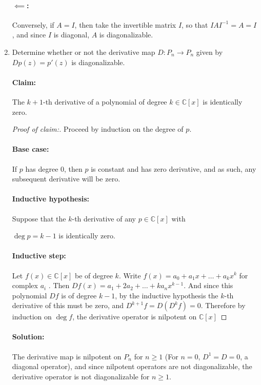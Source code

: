 \documentclass{article}
\begin{document}
\begin{enumerate}
    \paragraph{$\impliedby$:} Conversely, if $A=I$, then take the invertible matrix $I$, so that $IAI^{-1}=A=I$, and since $I$ is diagonal, $A$ is diagonalizable. 

\item Determine whether or not the derivative map $D : P_n \rightarrow P_n$ given by $Dp(z) = p'(z)$ is diagonalizable.
    \paragraph{Claim: }The $k+1$-th derivative of a polynomial of degree $k\in \mathbb{C}[x]$ is identically zero. 
    \begin{proof} [Proof of claim:]
        
  Proceed by induction on the degree of $p$. 
  \paragraph{Base case:} If $p$ has degree $0$, then $p$ is constant and has zero derivative, and as such, any subsequent derivative will be zero.
  \paragraph{Inductive hypothesis:} Suppose that the $k$-th derivative of any  $p \in \mathbb{C}[x]$ with 

  $\deg p=k-1$ is identically zero.
  \paragraph{Inductive step:} Let $f(x)\in \mathbb{C}[x]$ be of degree $k$. Write $f(x)=a_0+a_1x+\ldots+a_kx^{k}$ for complex $a_i$ . Then $Df(x)=a_1+2a_2+\ldots+ka_nx^{k-1}$. And since this polynomial $Df$ is of degree $k-1$, by the inductive hypothesis the $k$-th derivative of this must be zero, and \newline $D^{k+1}f=D(D^{k}f)=0$. Therefore by induction on $\deg f$, the derivative operator is nilpotent on $\mathbb{C}[x]$
    \end{proof}
  \paragraph{Solution: } The derivative map is nilpotent on $P_n$ for $n\geq 1$ (For $n=0$, $D^{1}=D=0$, a diagonal operator), and since nilpotent operators are not diagonalizable, the derivative operator is not diagonalizable for $n\geq 1$.

\end{enumerate}
\end{document}
